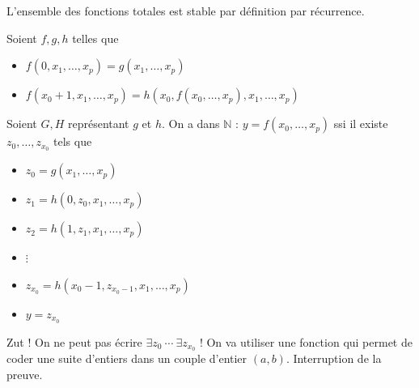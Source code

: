\documentclass[./main]{subfiles}
\begin{document}
 \begin{lem}
   L'ensemble des fonctions totales est stable par définition par récurrence.
   \label{lem:repr-rec}
 \end{lem}
 \begin{prv}
   Soient $f, g, h$ telles que 
    \begin{itemize}
     \item $f(0, x_1, \ldots, x_p) = g(x_1, \ldots, x_p)$
     \item $f(x_0 + 1, x_1, \ldots, x_p) = h(x_0, f(x_0, \ldots, x_p), x_1, \ldots, x_p)$
   \end{itemize}
   Soient $G, H$ représentant $g$ et $h$.
   On a dans $\mathds{N}$ : $y = f(x_0, \ldots, x_p)$ ssi il existe $z_0, \ldots, z_{x_0}$ tels que 
   \begin{itemize}
     \item $z_0 = g(x_1, \ldots, x_p)$
     \item $z_1 = h(0, z_0, x_1, \ldots, x_p)$
     \item $z_2 = h(1, z_1, x_1, \ldots, x_p)$
     \item $\vdots$ 
     \item $z_{x_0} = h(x_0-1, z_{x_0 - 1}, x_1, \ldots, x_p)$
     \item $y = z_{x_0}$
   \end{itemize}
   Zut ! On ne peut pas écrire $\exists z_0 \: \cdots \: \exists z_{x_0}$ !
   On va utiliser une fonction qui permet de coder une suite d'entiers dans un couple d'entier $(a,b)$.
   Interruption de la preuve. 
 \end{prv}
\end{document}
